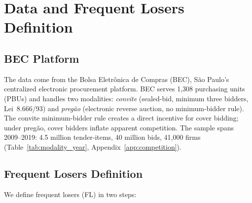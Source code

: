 

\section{Data and Frequent Losers Definition}
\label{sec:data}

\subsection{BEC Platform}
\label{sec:bec}

The data come from the Bolsa Eletr\^onica de Compras (BEC), S\~ao
Paulo's centralized electronic procurement platform. BEC serves 1,308
purchasing units (PBUs) and handles two modalities:
\emph{convite} (sealed-bid, minimum three bidders, Lei~8.666/93) and
\emph{preg\~ao} (electronic reverse auction, no minimum-bidder rule).
The convite minimum-bidder rule creates a direct incentive for cover
bidding; under preg\~ao, cover bidders inflate apparent competition.
The sample spans 2009--2019: 4.5 million tender-items,
40 million bids, 41,000 firms
(Table~\ref{tab:modality_year}, Appendix~\ref{app:competition}).

\subsection{Frequent Losers Definition}
\label{sec:fl_definition}

We define frequent losers (FL) in two steps:

